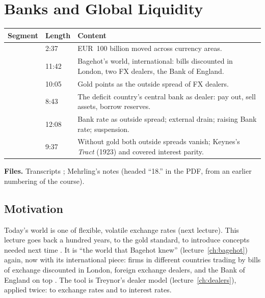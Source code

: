 \chapter{Banks and Global Liquidity}\label{ch:globalliq}
\begin{paracol}{2}

\begin{sources}
\begin{tabularx}{\linewidth}{@{}l l L@{}}
\toprule
\textbf{Segment} & \textbf{Length} & \textbf{Content}\\
\midrule
{} & 2:37 & EUR~100 billion moved across currency areas.\\
 & 11:42 & Bagehot's world, international: bills discounted in London, two FX dealers, the Bank of England.\\
 & 10:05 & Gold points as the outside spread of FX dealers.\\
 & 8:43 & The deficit country's central bank as dealer: pay out, sell assets, borrow reserves.\\
 & 12:08 & Bank rate as outside spread; external drain; raising Bank rate; suspension.\\
 & 9:37 & Without gold both outside spreads vanish; Keynes's \emph{Tract} (1923) and covered interest parity.\\
\bottomrule
\end{tabularx}

\smallskip
\textbf{Files.} Transcripts ; Mehrling's notes  (headed ``18.'' in the PDF, from an earlier numbering of the course).
\end{sources}

\section*{Motivation}
Today's world is one of flexible, volatile exchange rates (next lecture). This lecture goes back a hundred years, to the gold standard, to introduce concepts
needed next time . It is ``the world that Bagehot knew'' (lecture~\ref{ch:bagehot}) again, now with its international piece: firms in different
countries trading by bills of exchange discounted in London, foreign exchange dealers, and the Bank of England on top . The tool is
Treynor's dealer model (lecture~\ref{ch:dealers}), applied twice: to exchange rates and to interest rates.


\end{paracol}
